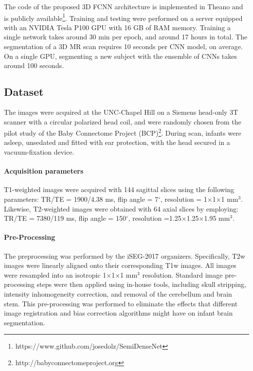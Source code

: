 \documentclass[twoside,espcrc2]{elsarticle}
\begin{document}
The code of the proposed 3D FCNN architecture is implemented in Theano \cite{bergstra2010theano} and is publicly available\footnote{https://www.github.com/josedolz/SemiDenseNet}. Training and testing were performed on a server equipped with an NVIDIA Tesla P100 GPU with 16 GB of RAM memory. Training a single network takes around 30 min per epoch, and around 17 hours in total. The segmentation of a 3D MR scan requires 10 seconds per CNN model, on average. On a single GPU, segmenting a new subject with the ensemble of CNNs takes around 100 seconds.

\subsection{Dataset}

The images were acquired at the UNC-Chapel Hill on a Siemens head-only 3T scanner with a circular polarized head coil, and were randomly chosen from the pilot study of the Baby Connectome Project (BCP)\footnote{http://babyconnectomeproject.org}. During scan, infants were asleep, unsedated and fitted with ear protection, with the head secured in a vacuum-fixation device.

\paragraph{Acquisition parameters}

T1-weighted images were acquired with 144 sagittal slices using the following parameters: TR/TE = 1900/4.38 ms, flip angle = 7$^\circ$, resolution = 1$\times$1$\times$1 mm$^3$. Likewise, T2-weighted images were obtained with 64 axial slices by employing: TR/TE = 7380/119 ms, flip angle = 150$^\circ$, resolution =1.25$\times$1.25$\times$1.95 mm$^3$.

\paragraph{Pre-Processing}

The preprocessing was performed by the iSEG-2017 organizers. Specifically, T2w images were linearly aligned onto their corresponding T1w images. All images were resampled into an isotropic 1$\times$1$\times$1 mm$^3$ resolution. Standard image pre-processing steps were then applied using in-house tools, including skull stripping, intensity inhomogeneity correction, and removal of the cerebellum and brain stem. This pre-processing was performed to eliminate the effects that different image registration and bias correction algorithms might have on infant brain segmentation. 
\end{document}
